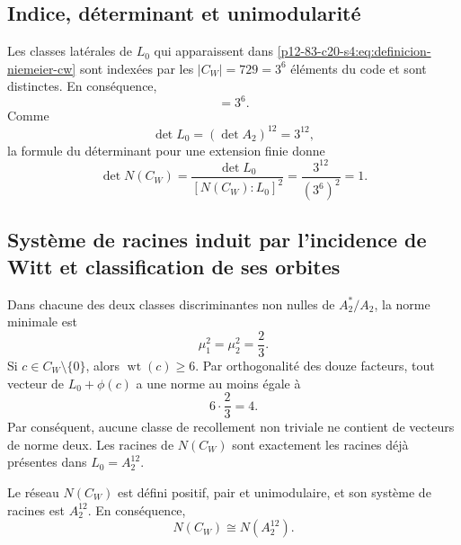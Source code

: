 \subsection{Indice, déterminant et unimodularité}

Les classes latérales de \(L_0\) qui apparaissent dans
\eqref{p12-83-c20-s4:eq:definicion-niemeier-cw} sont indexées par les
\(|C_W|=729=3^6\) éléments du code et sont distinctes. En conséquence,
\begin{equation}
 [N(C_W):L_0]=3^6.
 \label{p12-83-c20-s4:eq:indice-niemeier-sobre-a2-doce}
\end{equation}
Comme
\[
 \det L_0=(\det A_2)^{12}=3^{12},
\]
la formule du déterminant pour une extension finie donne
\begin{equation}
 \det N(C_W)
 =\frac{\det L_0}{[N(C_W):L_0]^2}
 =\frac{3^{12}}{(3^6)^2}=1.
 \label{p12-83-c20-s4:eq:determinante-niemeier-cw}
\end{equation}

\subsection{Système de racines induit par l'incidence de Witt et classification de ses orbites}

Dans chacune des deux classes discriminantes non nulles de
\(A_2^*/A_2\), la norme minimale est
\[
 \mu_1^2=\mu_2^2=\frac23.
\]
Si \(c\in C_W\setminus\{0\}\), alors
\(\operatorname{wt}(c)\geq6\). Par orthogonalité des douze facteurs,
tout vecteur de \(L_0+\phi(c)\) a une norme au moins égale à
\begin{equation}
 6\cdot\frac23=4.
 \label{p12-83-c20-s4:eq:cota-clases-no-triviales-niemeier}
\end{equation}
Par conséquent, aucune classe de recollement non triviale ne contient de vecteurs de norme
deux. Les racines de \(N(C_W)\) sont exactement les racines déjà présentes dans
\(L_0=A_2^{12}\).

\begin{theorem}
\label{p12-83-c20-s4:thm:niemeier-a2-doce-autonomo}
Le réseau \(N(C_W)\) est défini positif, pair et unimodulaire, et son système
de racines est \(A_2^{12}\). En conséquence,
\begin{equation}
 \boxed{N(C_W)\cong N(A_2^{12}).}
 \label{p12-83-c20-s4:eq:identificacion-niemeier-a2-doce}
\end{equation}
\end{theorem}

